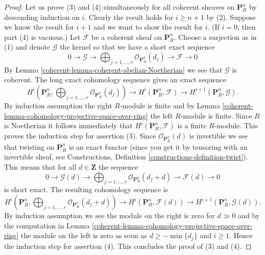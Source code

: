\begin{proof}
\medskip\noindent
Let us prove (3) and (4) simultaneously for all coherent sheaves
on $\mathbf{P}^n_R$ by descending induction on $i$. Clearly the result
holds for $i \geq n + 1$ by (2). Suppose we know the result for
$i + 1$ and we want to show the result for $i$. (If $i = 0$, then
part (4) is vacuous.) Let $\mathcal{F}$ be a coherent sheaf on
$\mathbf{P}^n_R$. Choose a surjection as in (1) and denote
$\mathcal{G}$ the kernel so that we have a short exact sequence
$$
0 \to \mathcal{G} \to
\bigoplus\nolimits_{j = 1, \ldots, r}
\mathcal{O}_{\mathbf{P}^n_R}(d_j)
\to
\mathcal{F} \to 0
$$
By Lemma \ref{coherent-lemma-coherent-abelian-Noetherian}
we see that $\mathcal{G}$ is coherent. The long exact
cohomology sequence gives an exact sequence
$$
H^i(\mathbf{P}^n_R, \bigoplus\nolimits_{j = 1, \ldots, r}
\mathcal{O}_{\mathbf{P}^n_R}(d_j))
\to
H^i(\mathbf{P}^n_R, \mathcal{F})
\to
H^{i + 1}(\mathbf{P}^n_R, \mathcal{G}).
$$
By induction assumption the right $R$-module is finite and by
Lemma \ref{coherent-lemma-cohomology-projective-space-over-ring} the left
$R$-module is finite. Since $R$ is Noetherian it follows immediately
that $H^i(\mathbf{P}^n_R, \mathcal{F})$ is a finite $R$-module.
This proves the induction step for assertion (3).
Since $\mathcal{O}_{\mathbf{P}^n_R}(d)$ is invertible
we see that twisting on $\mathbf{P}^n_R$ is an exact functor (since
you get it by tensoring with an invertible sheaf, see
Constructions, Definition \ref{constructions-definition-twist}).
This means that for all $d \in \mathbf{Z}$ the sequence
$$
0 \to \mathcal{G}(d) \to
\bigoplus\nolimits_{j = 1, \ldots, r}
\mathcal{O}_{\mathbf{P}^n_R}(d_j + d)
\to
\mathcal{F}(d) \to 0
$$
is short exact. The resulting cohomology sequence is
$$
H^i(\mathbf{P}^n_R, \bigoplus\nolimits_{j = 1, \ldots, r}
\mathcal{O}_{\mathbf{P}^n_R}(d_j + d))
\to
H^i(\mathbf{P}^n_R, \mathcal{F}(d))
\to
H^{i + 1}(\mathbf{P}^n_R, \mathcal{G}(d)).
$$
By induction assumption we see the module on the right is zero
for $d \gg 0$ and by the computation in
Lemma \ref{coherent-lemma-cohomology-projective-space-over-ring}
the module on the left is zero as soon as $d \geq -\min\{d_j\}$
and $i \geq 1$. Hence the induction step for assertion (4).
This concludes the proof of (3) and (4).


\end{proof}
